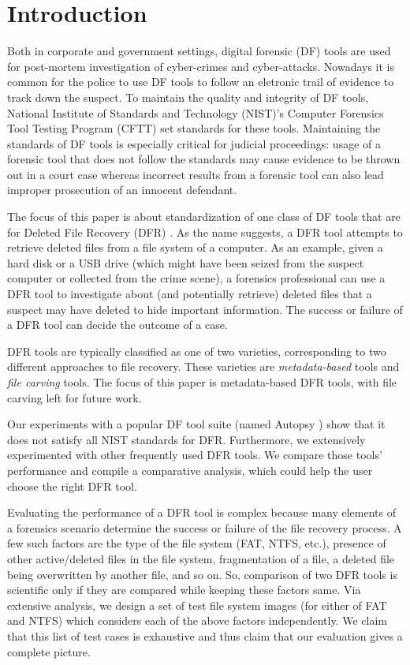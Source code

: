 
\section{Introduction}

Both in corporate and government settings, digital forensic (DF) tools are used for post-mortem investigation of cyber-crimes and cyber-attacks. 
Nowadays it is common \cite{df:news} for the police to use DF tools to follow an eletronic trail of evidence to track down the suspect. 
To maintain the quality and integrity of DF tools, National Institute of Standards and Technology (NIST)'s 
Computer Forensics Tool Testing Program (CFTT) \cite{cftt:nist} 
set standards for these tools. Maintaining the standards of DF tools 
is especially critical for judicial proceedings: usage of a forensic tool that does not follow the standards may cause evidence to be thrown 
out in a court case whereas incorrect results from a forensic tool can also lead improper prosecution of an innocent defendant. 

The focus of this paper is about standardization of one class of DF 
tools that are for Deleted File Recovery (DFR) \cite{meta:dfr:standards}. 
As the name suggests, a DFR tool attempts to retrieve deleted files
from a file system of a computer. As an example, given a hard disk or a USB drive 
(which might have been seized from the suspect computer or collected from the crime scene), a 
forensics professional can use a DFR tool to investigate about (and potentially retrieve) deleted files that 
a suspect may have deleted to hide important information. 
The success or failure of a DFR tool can decide the outcome of a case.  

DFR tools are typically classified as one of two varieties, corresponding to two different approaches to file recovery.
These varieties are \emph{metadata-based} tools and \emph{file carving} tools.
The focus of this paper is metadata-based DFR tools, with file carving left for future work.

Our experiments with a popular DF tool suite (named Autopsy \cite{autopsy}) 
show that it does not satisfy all NIST standards for DFR. 
Furthermore, we extensively experimented with other frequently used DFR tools. 
We compare those tools' performance and compile a comparative analysis, which could help the user choose the right DFR tool. 

Evaluating the performance of a DFR tool is complex because many elements of a forensics scenario determine 
the success or failure of the file recovery process. 
A few such factors are the type of the file system (FAT, NTFS, etc.), presence of other active/deleted 
files in the file system, fragmentation of a file, a deleted file being overwritten by another file, and so on.
So, comparison of two DFR tools is scientific only if they are compared while keeping these factors same. 
Via extensive analysis, we design a set of test file system images (for either of FAT and NTFS) which considers each of the above factors independently. 
We claim that this list of test cases is exhaustive and thus claim that our evaluation gives a complete picture. 

